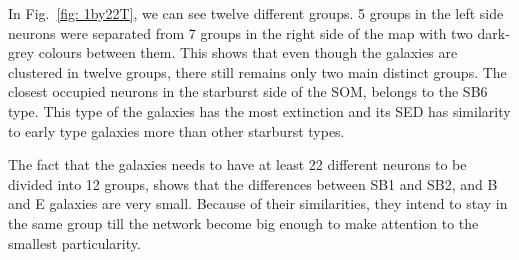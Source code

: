             In Fig.~\ref{fig: 1by22T}, we can see twelve different groups. 
            5 groups in the left side neurons were separated from 7 groups in the right side of the map with two dark-grey colours between them.
            This shows that even though the galaxies are clustered in twelve groups, there still remains only two main distinct groups.
            The closest occupied neurons in the starburst side of the SOM, belongs to the SB6 type. 
            This type of the galaxies has the most extinction and its SED has similarity to early type galaxies more than other starburst types. 
            
            The fact that the galaxies needs to have at least 22 different neurons to be divided into 12 groups, shows that the differences between SB1 and SB2, and B and E galaxies are very small.
            Because of their similarities, they intend to stay in the same group till the network become big enough to make attention to the smallest particularity.
           
